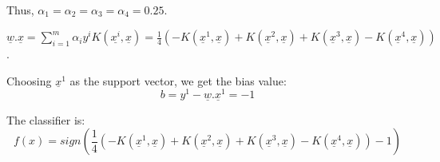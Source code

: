 \documentclass[letter, 12pt]{article}
\begin{document}
\begin{enumerate}
\begin{itemize}
\begin{align*}
    		\end{align*}
    		\par{Thus, $ \alpha_1 = \alpha_2 = \alpha_3 = \alpha_4 = 0.25 $.}
    		\par{$ \underline{w}.\underline{x} = \sum_{i=1}^m \alpha_i y^i K(\underline{x^i}, \underline{x}) = \frac{1}{4}(-K(\underline{x}^1, \underline{x}) + K(\underline{x}^2, \underline{x}) + K(\underline{x}^3, \underline{x}) - K(\underline{x}^4, \underline{x}))$.}
    		\par{Choosing $ \underline{x}^1 $ as the support vector, we get the bias value:}
    		\[ b = y^1 - \underline{w}.\underline{x}^1 = -1 \]
    		\par{The classifier is:}
    		\[ f(x) = sign(\frac{1}{4}(-K(\underline{x}^1, \underline{x}) + K(\underline{x}^2, \underline{x}) + K(\underline{x}^3, \underline{x}) - K(\underline{x}^4, \underline{x})) - 1) \]
    		

\end{itemize}
\end{enumerate}
\end{document}
